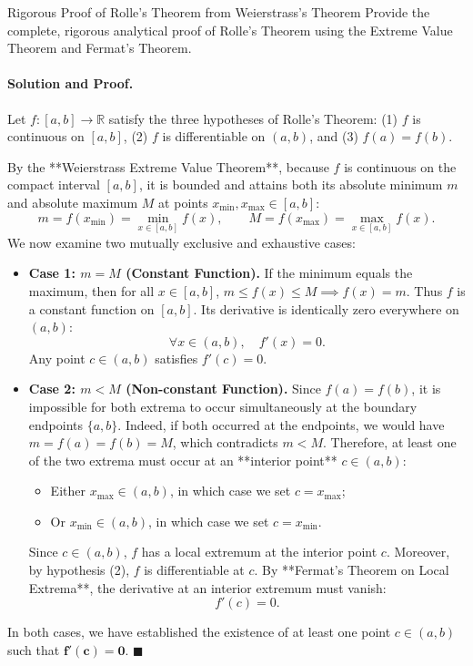 \begin{workedexample}{Rigorous Proof of Rolle's Theorem from Weierstrass's Theorem}
Provide the complete, rigorous analytical proof of Rolle's Theorem using the Extreme Value Theorem and Fermat's Theorem.

\paragraph{Solution and Proof.}
Let $f: [a, b] \longrightarrow \mathbb{R}$ satisfy the three hypotheses of Rolle's Theorem:
(1) $f$ is continuous on $[a, b]$, (2) $f$ is differentiable on $(a, b)$, and (3) $f(a) = f(b)$.

By the **Weierstrass Extreme Value Theorem**, because $f$ is continuous on the compact interval $[a, b]$, it is bounded and attains both its absolute minimum $m$ and absolute maximum $M$ at points $x_{\min}, x_{\max} \in [a, b]$:
\[
m = f(x_{\min}) = \min_{x \in [a, b]} f(x), \qquad M = f(x_{\max}) = \max_{x \in [a, b]} f(x).
\]
We now examine two mutually exclusive and exhaustive cases:
\begin{itemize}[leftmargin=1.4em,itemsep=3pt]
  \item \textbf{Case 1: $m = M$ (Constant Function).}
  If the minimum equals the maximum, then for all $x \in [a, b]$, $m \le f(x) \le M \implies f(x) = m$.
  Thus $f$ is a constant function on $[a, b]$.
  Its derivative is identically zero everywhere on $(a, b)$:
  \[
  \forall x \in (a, b), \quad f'(x) = 0.
  \]
  Any point $c \in (a, b)$ satisfies $f'(c) = 0$.

  \item \textbf{Case 2: $m < M$ (Non-constant Function).}
  Since $f(a) = f(b)$, it is impossible for both extrema to occur simultaneously at the boundary endpoints $\{a, b\}$.
  Indeed, if both occurred at the endpoints, we would have $m = f(a) = f(b) = M$, which contradicts $m < M$.
  Therefore, at least one of the two extrema must occur at an **interior point** $c \in (a, b)$:
  \begin{itemize}[leftmargin=1.2em,itemsep=1pt]
    \item Either $x_{\max} \in (a, b)$, in which case we set $c = x_{\max}$;
    \item Or $x_{\min} \in (a, b)$, in which case we set $c = x_{\min}$.
  \end{itemize}
  Since $c \in (a, b)$, $f$ has a local extremum at the interior point $c$.
  Moreover, by hypothesis (2), $f$ is differentiable at $c$.
  By **Fermat's Theorem on Local Extrema**, the derivative at an interior extremum must vanish:
  \[
  f'(c) = 0.
  \]
\end{itemize}
In both cases, we have established the existence of at least one point $c \in (a, b)$ such that $\mathbf{f'(c) = 0}$. $\blacksquare$
\end{workedexample}

